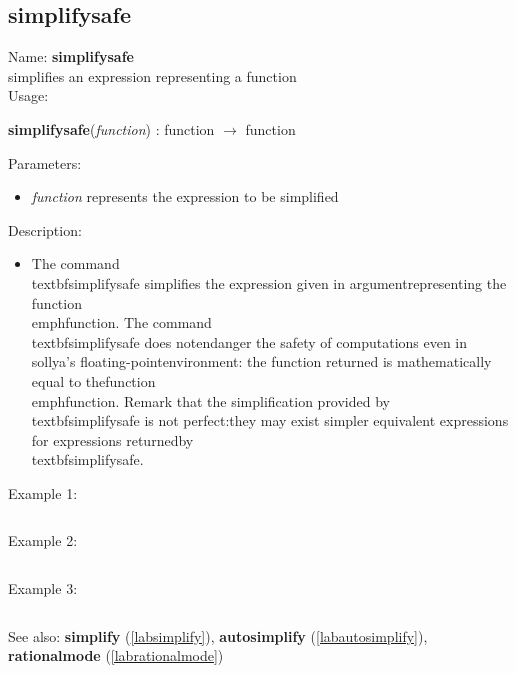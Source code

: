 \subsection{simplifysafe}
\label{labsimplifysafe}
\noindent Name: \textbf{simplifysafe}\\
simplifies an expression representing a function\\
\noindent Usage: 
\begin{center}
\textbf{simplifysafe}(\emph{function}) : \textsf{function} $\rightarrow$ \textsf{function}\\
\end{center}
Parameters: 
\begin{itemize}
\item \emph{function} represents the expression to be simplified
\end{itemize}
\noindent Description: \begin{itemize}

\item The command \\textbf{simplifysafe} simplifies the expression given in argument\n   representing the function \\emph{function}.  The command \\textbf{simplifysafe} does not\n   endanger the safety of computations even in \\sollya's floating-point\n   environment: the function returned is mathematically equal to the\n   function \\emph{function}. \n    \n   Remark that the simplification provided by \\textbf{simplifysafe} is not perfect:\n   they may exist simpler equivalent expressions for expressions returned\n   by \\textbf{simplifysafe}.\n\end{itemize}
\noindent Example 1: 
\begin{center}\begin{minipage}{15cm}\begin{Verbatim}[frame=single]
\end{Verbatim}
\end{minipage}\end{center}
\noindent Example 2: 
\begin{center}\begin{minipage}{15cm}\begin{Verbatim}[frame=single]
\end{Verbatim}
\end{minipage}\end{center}
\noindent Example 3: 
\begin{center}\begin{minipage}{15cm}\begin{Verbatim}[frame=single]
\end{Verbatim}
\end{minipage}\end{center}
See also: \textbf{simplify} (\ref{labsimplify}), \textbf{autosimplify} (\ref{labautosimplify}), \textbf{rationalmode} (\ref{labrationalmode})
